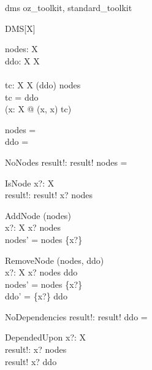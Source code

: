 \zedindent -1mm
\pagestyle{empty}
\raggedbottom


\begin{zsection}
  \SECTION dms \parents oz\_toolkit, standard\_toolkit
\end{zsection}

\begin{class}{DMS}[X]
\also
\begin{state}
  nodes: \finset X  \\
  ddo:  X  \rel  X  \\
  \Delta\\
  tc:  X  \rel  X  
\where
  \dom (ddo) \subseteq nodes \land \\ 
  tc = ddo\plus \land \\ 
  \lnot (\exists x:  X @ (x, x) \in tc)
\end{state}
\begin{init}
  nodes = \emptyset \\ 
  ddo = \emptyset
\end{init}
\begin{op}{NoNodes}
  result!:  \bool 
\where
  result! \iff nodes = \emptyset \\ 
\end{op}
\begin{op}{IsNode}
  x?:  X  \\
  result!:  \bool  
\where
  result! \iff x? \in nodes
\end{op}
\begin{op}{AddNode}
  \Delta (nodes)\\
  x?:  X  
\where
  x? \notin nodes \\ 
  nodes' = nodes \cup \{x?\}
\end{op}
\begin{op}{RemoveNode}
  \Delta (nodes, ddo)\\
  x?:  X  
\where
  x? \in nodes \setminus  \ran ddo \\
  nodes' = nodes \setminus \{x?\} \land \\ 
  ddo' = \{x?\} \ndres ddo
\end{op}
\begin{op}{NoDependencies}
  result!:  \bool  
\where
  result! \iff ddo = \emptyset
\end{op}
\begin{op}{DependedUpon}
  x?:  X  \\
  result!:  \bool  
\where
  x? \in nodes\\
  result! \iff x? \in  \ran ddo
\end{op}

\end{class}
